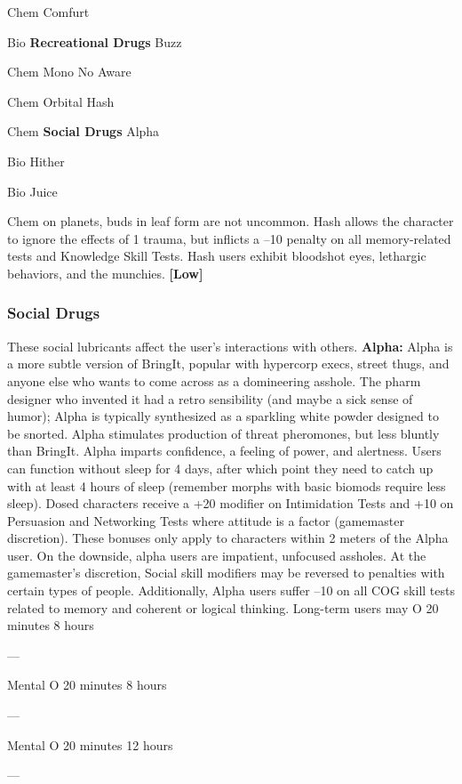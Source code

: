 Chem
Comfurt

Bio
\textbf{Recreational Drugs}
Buzz

Chem
Mono No Aware

Chem
Orbital Hash

Chem
\textbf{Social Drugs}
Alpha

Bio
Hither

Bio
Juice

Chem
on planets, buds in leaf form are not uncommon. Hash 
allows the character to ignore the effects of 1 trauma, 
but inflicts a –10 penalty on all memory-related tests 
and Knowledge Skill Tests. Hash users exhibit bloodshot
eyes, lethargic behaviors, and the munchies. \textbf{[Low]}

\subsubsection{Social Drugs}

These social lubricants affect the user's interactions 
with others.
\textbf{Alpha:} Alpha is a more subtle version of BringIt, 
popular with hypercorp execs, street thugs, and 
anyone else who wants to come across as a domineering
asshole. The pharm designer who invented it had
a retro sensibility (and maybe a sick sense of humor); 
Alpha is typically synthesized as a sparkling white 
powder designed to be snorted. Alpha stimulates 
production of threat pheromones, but less bluntly 
than BringIt. Alpha imparts confidence, a feeling of 
power, and alertness. Users can function without sleep 
for 4 days, after which point they need to catch up 
with at least 4 hours of sleep (remember morphs with 
basic biomods require less sleep). Dosed characters 
receive a +20 modifier on Intimidation Tests and +10 
on Persuasion and Networking Tests where attitude is 
a factor (gamemaster discretion). These bonuses only 
apply to characters within 2 meters of the Alpha user.
On the downside, alpha users are impatient, unfocused
assholes. At the gamemaster's discretion, Social
skill modifiers may be reversed to penalties with 
certain types of people. Additionally, Alpha users 
suffer –10 on all COG skill tests related to memory 
and coherent or logical thinking. Long-term users may 
O
20 minutes
8 hours

—

Mental
O
20 minutes
8 hours

—

Mental
O
20 minutes
12 hours

—

